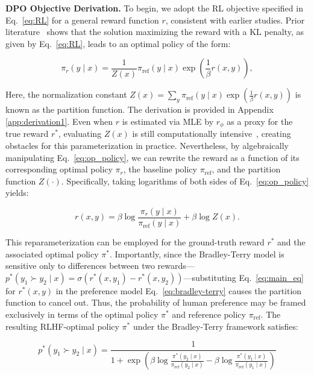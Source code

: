 \textbf{DPO Objective Derivation.} To begin, we adopt the RL objective specified in Eq.~\ref{eq:RL} for a general reward function $r$, consistent with earlier studies. Prior literature~\citep{peters2007reinforcement, peng2019advantage, korbak2022reinforcement, go2023aligning} shows that the solution maximizing the reward with a KL penalty, as given by Eq.~\ref{eq:RL}, leads to an optimal policy of the form:

\begin{equation}\label{eq:op_policy}
    \pi_r(y\mid x) = \frac{1}{Z(x)}\pi_\text{ref}(y\mid x)\exp\left(\frac{1}{\beta}r(x, y)\right),
\end{equation}

Here, the normalization constant $Z(x) = \sum_{y}\pi_\text{ref}(y\mid x)\exp\left(\frac{1}{\beta}r(x, y)\right)$ is known as the partition function. The derivation is provided in Appendix \ref{app:derivation1}. Even when $r$ is estimated via MLE by $r_{\phi}$ as a proxy for the true reward $r^*$, evaluating $Z(x)$ is still computationally intensive~\citep{korbak2022reinforcement, go2023aligning}, creating obstacles for this parameterization in practice. Nevertheless, by algebraically manipulating Eq.~\ref{eq:op_policy}, we can rewrite the reward as a function of its corresponding optimal policy $\pi_r$, the baseline policy $\pi_\text{ref}$, and the partition function $Z(\cdot)$. Specifically, taking logarithms of both sides of Eq.~\ref{eq:op_policy} yields:

\begin{equation}\label{eq:main_eq}
    r(x,y) =\beta \log \frac{\pi_r(y\mid x)}{\pi_\text{ref}(y\mid x)} + \beta \log Z(x).
\end{equation}

This reparameterization can be employed for the ground-truth reward $r^*$ and the associated optimal policy $\pi^*$. Importantly, since the Bradley-Terry model is sensitive only to differences between two rewards—${p^*(y_1 \succ y_2 \mid x) = \sigma(r^*(x, y_1) - r^*(x, y_2))}$—substituting Eq.~\ref{eq:main_eq} for $r^*(x,y)$ in the preference model Eq.~\ref{eq:bradley-terry} causes the partition function to cancel out. Thus, the probability of human preference may be framed exclusively in terms of the optimal policy $\pi^*$ and reference policy $\pi_\text{ref}$. The resulting RLHF-optimal policy $\pi^*$ under the Bradley-Terry framework satisfies:

\begin{equation}\label{eq:objective}
    p^*(y_1\succ y_2 \mid x)=\frac{1}{1 + \exp\left(\beta \log \frac{\pi^*(y_2\mid x)}{\pi_\text{ref}(y_2\mid x)} - \beta \log \frac{\pi^*(y_1\mid x)}{\pi_\text{ref}(y_1\mid x)}\right)}
\end{equation}

